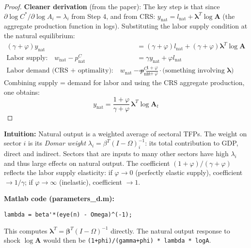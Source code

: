 \documentclass[12pt]{article}
\begin{document}
\begin{proof}
\textbf{Cleaner derivation} (from the paper): The key step is that since $\partial \log C^*/\partial \log A_i = \lambda_i$ from Step 4, and from CRS: $y_{\mathrm{nat}} = l_{\mathrm{nat}} + \bm{\lambda}^T\log\mathbf{A}$ (the aggregate production function in logs). Substituting the labor supply condition at the natural equilibrium:
\begin{align}
    (\gamma+\varphi) y_{\mathrm{nat}} &= (\gamma+\varphi) l_{\mathrm{nat}} + (\gamma+\varphi)\bm{\lambda}^T\log\mathbf{A} \nonumber \\
    \text{Labor supply:}\quad  w_{\mathrm{nat}} - p^C_{\mathrm{nat}} &= \gamma y_{\mathrm{nat}} + \varphi l_{\mathrm{nat}} \nonumber \\
    \text{Labor demand (CRS + optimality):}\quad w_{\mathrm{nat}} - p^C_{\mathrm{nat}} &= \frac{1+\varphi}{\gamma+\varphi}\cdot\text{(something involving }\bm{\lambda}\text{)}
\end{align}
Combining supply = demand for labor and using the CRS aggregate production, one obtains:
\begin{equation}
    \boxed{y_{\mathrm{nat}} = \frac{1+\varphi}{\gamma+\varphi}\, \bm{\lambda}^T \log \mathbf{A}_t}
\end{equation}
\end{proof}

\begin{insight}
\textbf{Intuition:} Natural output is a weighted average of sectoral TFPs. The weight on sector $i$ is its \textit{Domar weight} $\lambda_i = \beta^T(I-\Omega)^{-1}_i$: its total contribution to GDP, direct and indirect. Sectors that are inputs to many other sectors have high $\lambda_i$ and thus large effects on natural output. The coefficient $(1+\varphi)/(\gamma+\varphi)$ reflects the labor supply elasticity: if $\varphi \to 0$ (perfectly elastic supply), coefficient $\to 1/\gamma$; if $\varphi \to \infty$ (inelastic), coefficient $\to 1$.
\end{insight}

\begin{codebox}
\textbf{Matlab code (parameters\_d.m):}
\begin{verbatim}
lambda = beta'*(eye(n) - Omega)^(-1);
\end{verbatim}
This computes $\bm{\lambda}^T = \bm{\beta}^T(I-\Omega)^{-1}$ directly. The natural output response to shock $\log\mathbf{A}$ would then be \texttt{(1+phi)/(gamma+phi) * lambda * logA}.
\end{codebox}

\end{document}
